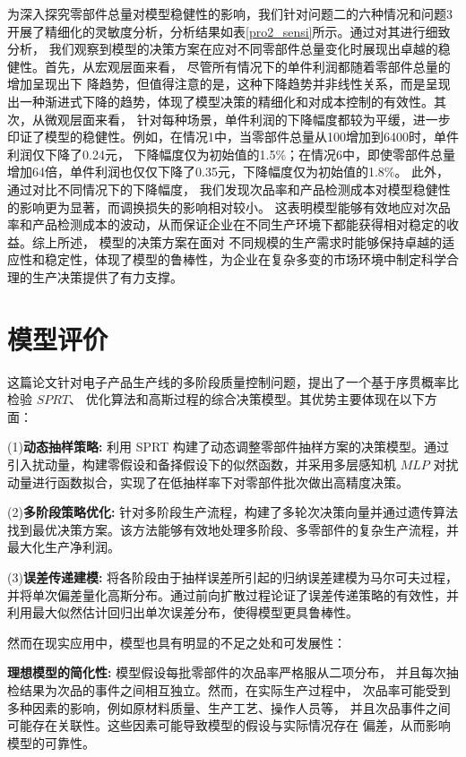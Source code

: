 \documentclass[withoutpreface,bwprint]{cumcmthesis} %
\begin{document}
为深入探究零部件总量对模型稳健性的影响，我们针对问题二的六种情况和问题3开展了精细化的灵敏度分析，分析结果如表\ref{pro2_sensi}所示。通过对其进行细致分析，
我们观察到模型的决策方案在应对不同零部件总量变化时展现出卓越的稳健性。首先，从宏观层面来看， 尽管所有情况下的单件利润都随着零部件总量的增加呈现出下
降趋势，但值得注意的是，这种下降趋势并非线性关系，而是呈现出一种渐进式下降的趋势，体现了模型决策的精细化和对成本控制的有效性。其次，从微观层面来看，
针对每种场景，单件利润的下降幅度都较为平缓，进一步印证了模型的稳健性。例如，在情况1中，当零部件总量从100增加到6400时，单件利润仅下降了0.24元，
下降幅度仅为初始值的1.5\%；在情况6中，即使零部件总量增加64倍，单件利润也仅仅下降了0.35元，下降幅度仅为初始值的1.8\%。
此外，通过对比不同情况下的下降幅度， 我们发现次品率和产品检测成本对模型稳健性的影响更为显著，而调换损失的影响相对较小。
这表明模型能够有效地应对次品率和产品检测成本的波动，从而保证企业在不同生产环境下都能获得相对稳定的收益。综上所述， 模型的决策方案在面对
不同规模的生产需求时能够保持卓越的适应性和稳定性，体现了模型的鲁棒性，为企业在复杂多变的市场环境中制定科学合理的生产决策提供了有力支撑。

\section{模型评价}
这篇论文针对电子产品生产线的多阶段质量控制问题，提出了一个基于序贯概率比检验 $SPRT$、
优化算法和高斯过程的综合决策模型。其优势主要体现在以下方面：

(1)\textbf{动态抽样策略:} 利用 SPRT 构建了动态调整零部件抽样方案的决策模型。通过引入扰动量，构建零假设和备择假设下的似然函数，并采用多层感知机 $MLP$ 对扰动量进行函数拟合，实现了在低抽样率下对零部件批次做出高精度决策。

(2)\textbf{多阶段策略优化:} 针对多阶段生产流程，构建了多轮次决策向量并通过遗传算法找到最优决策方案。该方法能够有效地处理多阶段、多零部件的复杂生产流程，并最大化生产净利润。

(3)\textbf{误差传递建模:} 将各阶段由于抽样误差所引起的归纳误差建模为马尔可夫过程，并将单次偏差量化高斯分布。通过前向扩散过程论证了误差传递策略的有效性，并利用最大似然估计回归出单次误差分布，使得模型更具鲁棒性。

然而在现实应用中，模型也具有明显的不足之处和可发展性：

\textbf{理想模型的简化性:} 模型假设每批零部件的次品率严格服从二项分布，
并且每次抽检结果为次品的事件之间相互独立。然而，在实际生产过程中，
次品率可能受到多种因素的影响，例如原材料质量、生产工艺、操作人员等，
并且次品事件之间可能存在关联性。这些因素可能导致模型的假设与实际情况存在
偏差，从而影响模型的可靠性。
\end{document}
